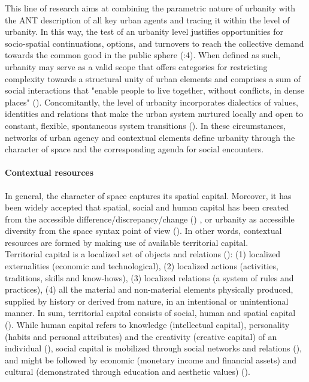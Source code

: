 \documentclass[11pt]{report}
\begin{document}
{{{This line of research aims at combining the parametric nature of urbanity with the ANT description of all key urban agents and tracing it within the level of urbanity. In this way, the test of an urbanity level justifies opportunities for socio-spatial continuations, options, and turnovers to reach the collective demand towards the common good in the public sphere (\href{Holden}{\citealt{holden_justifying_2015}}:4). 
When defined as such, urbanity may serve as a valid scope that offers categories for restricting complexity towards a structural unity of urban elements and comprises a sum of social interactions that "enable people  to  live  together,  without  conflicts,  in  dense places"
(\citealt{bisson_urbanity:_2016}).
Concomitantly, the level of urbanity incorporates dialectics of values, identities and relations that make the urban system nurtured locally and open to constant, flexible, spontaneous system transitions (\href{Groth}{\citealt{groth_reclaiming_2005}}).
In these circumstances, networks of urban agency and contextual elements define urbanity through the character of space and the corresponding agenda for social encounters.

\paragraph{Contextual resources}

In general, the character of space captures its spatial capital. 
Moreover, it has been widely accepted that spatial, social and human capital has been created from the accessible difference/discrepancy/change (\citealt{becker_human_1993}) \href{Coleman}{\citealt{coleman_social_1988}}, or urbanity as accessible diversity from the space syntax point of view (\href{Marcus}{\citealt{marcus_spatial_2007}}). In other words, contextual resources are formed by making use of available territorial capital.
\\

Territorial capital is a localized set of objects and relations (\href{Camagni}{\citealt{camagni_regional_2013}}):
(1) localized externalities (economic and technological),
(2) localized actions (activities, traditions, skills and know-hows),
(3) localized relations (a system of rules and practices),
(4) all the material and non-material elements physically produced, supplied by history or derived from nature, in an intentional or unintentional manner. In sum, territorial capital consists of social, human and spatial capital  (\href{Gronlund}{\citealt{gronlund_notions_2007}}).
While human capital refers to knowledge (intellectual capital), personality (habits and personal attributes) and the creativity (creative capital) of an individual (\href{Becker}{\citealt{becker_human_1993}}), social capital is mobilized through social networks and relations (\citealt{Bourdieu 1986}), and might be followed by economic (monetary income and  financial  assets) and cultural (demonstrated through education and aesthetic values) (\citealt{rerat_spatial_2011}).
\\

}}}
\end{document}
